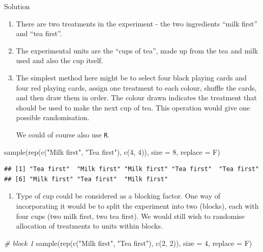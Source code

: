 \documentclass[
]{book}
\newenvironment{Shaded}{\begin{snugshade}}{\end{snugshade}}
\newcommand{\AttributeTok}[1]{\textcolor[rgb]{0.77,0.63,0.00}{#1}}
\newcommand{\CommentTok}[1]{\textcolor[rgb]{0.56,0.35,0.01}{\textit{#1}}}
\newcommand{\DecValTok}[1]{\textcolor[rgb]{0.00,0.00,0.81}{#1}}
\newcommand{\FunctionTok}[1]{\textcolor[rgb]{0.00,0.00,0.00}{#1}}
\newcommand{\NormalTok}[1]{#1}
\newcommand{\StringTok}[1]{\textcolor[rgb]{0.31,0.60,0.02}{#1}}
\providecommand{\tightlist}{%
  \setlength{\itemsep}{0pt}\setlength{\parskip}{0pt}}
\theoremstyle{definition}
\theoremstyle{definition}
\theoremstyle{definition}
\theoremstyle{definition}
\theoremstyle{remark}
\begin{document}
Solution

\begin{enumerate}
\def\labelenumi{\alph{enumi}.}
\item
  There are two treatments in the experiment - the two ingredients ``milk first'' and ``tea first''.
\item
  The experimental units are the ``cups of tea'', made up from the tea and milk used and also the cup itself.
\item
  The simplest method here might be to select four black playing cards and four red playing cards, assign one treatment to each colour, shuffle the cards, and then draw them in order. The colour drawn indicates the treatment that should be used to make the next cup of tea. This operation would give one possible randomisation.

  We could of course also use \texttt{R}.
\end{enumerate}

\begin{Shaded}
\begin{Highlighting}[]
\FunctionTok{sample}\NormalTok{(}\FunctionTok{rep}\NormalTok{(}\FunctionTok{c}\NormalTok{(}\StringTok{"Milk first"}\NormalTok{, }\StringTok{"Tea first"}\NormalTok{), }\FunctionTok{c}\NormalTok{(}\DecValTok{4}\NormalTok{, }\DecValTok{4}\NormalTok{)), }\AttributeTok{size =} \DecValTok{8}\NormalTok{, }\AttributeTok{replace =}\NormalTok{ F)}
\end{Highlighting}
\end{Shaded}

\begin{verbatim}
## [1] "Tea first"  "Milk first" "Milk first" "Tea first"  "Tea first" 
## [6] "Milk first" "Tea first"  "Milk first"
\end{verbatim}

\begin{enumerate}
\def\labelenumi{\alph{enumi}.}
\setcounter{enumi}{3}
\tightlist
\item
  Type of cup could be considered as a blocking factor. One way of incorporating it would be to split the experiment into two (blocks), each with four cups (two milk first, two tea first). We would still wish to randomise allocation of treatments to units within blocks.
\end{enumerate}

\begin{Shaded}
\begin{Highlighting}[]
    \CommentTok{\# block 1}
    \FunctionTok{sample}\NormalTok{(}\FunctionTok{rep}\NormalTok{(}\FunctionTok{c}\NormalTok{(}\StringTok{"Milk first"}\NormalTok{, }\StringTok{"Tea first"}\NormalTok{), }\FunctionTok{c}\NormalTok{(}\DecValTok{2}\NormalTok{, }\DecValTok{2}\NormalTok{)), }\AttributeTok{size =} \DecValTok{4}\NormalTok{, }\AttributeTok{replace =}\NormalTok{ F)}
\end{Highlighting}
\end{Shaded}
\end{document}
